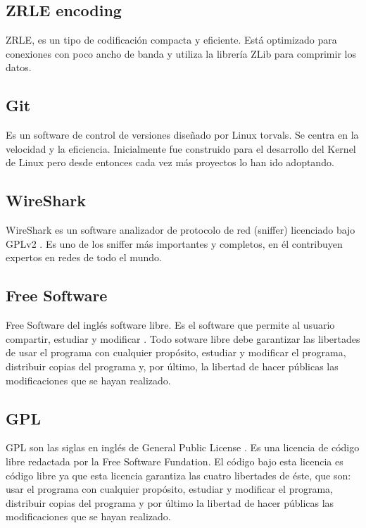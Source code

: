 \subsection{ZRLE encoding}

ZRLE, es un tipo de codificación compacta y eficiente. Está optimizado para conexiones con poco ancho de banda y utiliza la librería ZLib para comprimir los datos.

\subsection{Git}

Es un software de control de versiones diseñado por Linux torvals\cite{wiki:git}\cite{git:git}. Se centra en la velocidad y la eficiencia. Inicialmente fue construido para el desarrollo del Kernel de Linux pero desde entonces cada vez más proyectos lo han ido adoptando.

\subsection{WireShark}

WireShark es un software analizador de protocolo de red (sniffer) licenciado bajo GPLv2 \cite{wiresharkpage:wireshark}. Es uno de los sniffer más importantes y completos, en él contribuyen expertos en redes de todo el mundo.

\subsection{Free Software}

Free Software del inglés software libre. Es el software que permite al usuario compartir, estudiar y modificar \cite{FSpage:FS}. Todo sotware libre debe garantizar las libertades de usar el programa con cualquier propósito, estudiar y modificar el programa, distribuir copias del programa y, por último, la libertad de hacer públicas las modificaciones que se hayan realizado.

\subsection{GPL}

GPL son las siglas en inglés de General Public License \cite{GPLpage:GPL}. Es una licencia de código libre redactada por la Free Software Fundation. El código bajo esta licencia es código libre ya que esta licencia garantiza las cuatro libertades de éste, que son: usar el programa con cualquier propósito, estudiar y modificar el programa, distribuir copias del programa y por último la libertad de hacer públicas las modificaciones que se hayan realizado.
\newpage
